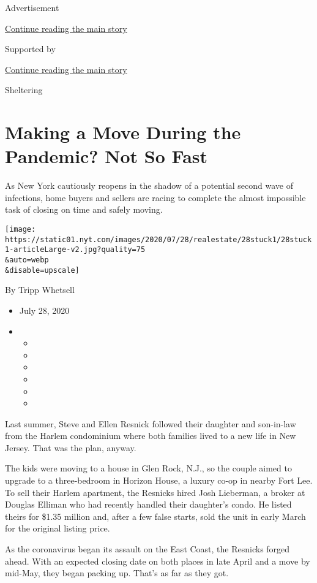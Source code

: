 Advertisement

\protect\hyperlink{after-top}{Continue reading the main story}

Supported by

\protect\hyperlink{after-sponsor}{Continue reading the main story}

Sheltering

\hypertarget{making-a-move-during-the-pandemic-not-so-fast}{%
\section{Making a Move During the Pandemic? Not So
Fast}\label{making-a-move-during-the-pandemic-not-so-fast}}

As New York cautiously reopens in the shadow of a potential second wave
of infections, home buyers and sellers are racing to complete the almost
impossible task of closing on time and safely moving.

\texttt{[image: https://static01.nyt.com/images/2020/07/28/realestate/28stuck1/28stuck1-articleLarge-v2.jpg?quality=75\\\&auto=webp\\\&disable=upscale]}

By Tripp Whetsell

\begin{itemize}
\item
  July 28, 2020
\item
  \begin{itemize}
  \item
  \item
  \item
  \item
  \item
  \item
  \end{itemize}
\end{itemize}

Last summer, Steve and Ellen Resnick followed their daughter and
son-in-law from the Harlem condominium where both families lived to a
new life in New Jersey. That was the plan, anyway.

The kids were moving to a house in Glen Rock, N.J., so the couple aimed
to upgrade to a three-bedroom in Horizon House, a luxury co-op in nearby
Fort Lee. To sell their Harlem apartment, the Resnicks hired Josh
Lieberman, a broker at Douglas Elliman who had recently handled their
daughter's condo. He listed theirs for \$1.35 million and, after a few
false starts, sold the unit in early March for the original listing
price.

As the coronavirus began its assault on the East Coast, the Resnicks
forged ahead. With an expected closing date on both places in late April
and a move by mid-May, they began packing up. That's as far as they got.

